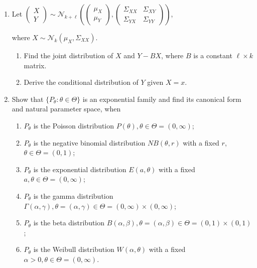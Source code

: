 \begin{enumerate}
    \item Let $\begin{pmatrix}X \\ Y\end{pmatrix} \sim \mathcal{N}_{k+\ell}\left(\begin{pmatrix}\mu_X \\ \mu_Y\end{pmatrix},
    \begin{pmatrix}
        \Sigma_{XX} & \Sigma_{XY} \\
        \Sigma_{YX} & \Sigma_{YY}
    \end{pmatrix}\right)$,
    
    
     where \(X\sim\mathcal{N}_{k}\left(\mu_{X},\Sigma_{XX}\right)\). 
    \begin{enumerate}
        \item Find the joint distribution of \(X\) and \(Y-BX\), where \(B\) is a constant \(\ell\times k\) matrix.
        \item Derive the conditional distribution of \(Y\) given \(X=x\).
    \end{enumerate}

    \item Show that \(\{P_{\theta}:\theta\in\Theta\}\) is an exponential family and find its canonical form and natural parameter space, when
    \begin{enumerate}
        \item \(P_{\theta}\) is the Poisson distribution \(P(\theta),\theta\in\Theta=(0,\infty)\);
        \item \(P_{\theta}\) is the negative binomial distribution \(NB(\theta,r)\) with a fixed \(r\), \(\theta\in\Theta=(0,1)\);
        \item \(P_{\theta}\) is the exponential distribution \(E(a,\theta)\) with a fixed \(a,\theta\in\Theta=(0,\infty)\);
        \item \(P_{\theta}\) is the gamma distribution \(\Gamma(\alpha,\gamma),\theta=(\alpha,\gamma)\in\Theta=(0,\infty)\times(0,\infty)\);
        \item \(P_{\theta}\) is the beta distribution \(B(\alpha,\beta),\theta=(\alpha,\beta)\in\Theta=(0,1)\times(0,1)\);
        \item \(P_{\theta}\) is the Weibull distribution \(W(\alpha,\theta)\) with a fixed \(\alpha>0,\theta\in\Theta=(0,\infty)\).
    \end{enumerate}


\end{enumerate}
